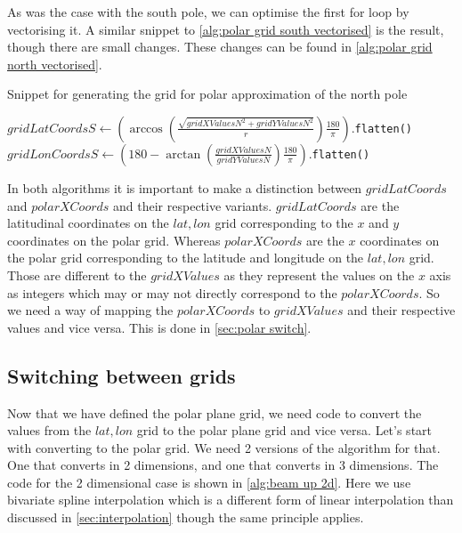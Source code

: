 As was the case with the south pole, we can optimise the first for loop by vectorising it. A similar snippet to \autoref{alg:polar grid south vectorised} is the result, though there are small 
changes. These changes can be found in \autoref{alg:polar grid north vectorised}.

\begin{algorithm}[htb]
    \caption{Snippet for generating the grid for polar approximation of the north pole}
    \label{alg:polar grid north vectorised}
    $gridLatCoordsS \leftarrow (\arccos(\frac{\sqrt{gridXValuesN^2 + gridYValuesN^2}}{r})\frac{180}{\pi}).$\texttt{flatten()} \;
    $gridLonCoordsS \leftarrow (180 - \arctan(\frac{gridXValuesN}{gridYValuesN})\frac{180}{\pi}).$\texttt{flatten()} \;
\end{algorithm}

In both algorithms it is important to make a distinction between $gridLatCoords$ and $polarXCoords$ and their respective variants. $gridLatCoords$ are the latitudinal coordinates on the 
$lat, lon$ grid corresponding to the $x$ and $y$ coordinates on the polar grid. Whereas $polarXCoords$ are the $x$ coordinates on the polar grid corresponding to the latitude and longitude on 
the $lat, lon$ grid. Those are different to the $gridXValues$ as they represent the values on the $x$ axis as integers which may or may not directly correspond to the $polarXCoords$. So we need 
a way of mapping the $polarXCoords$ to $gridXValues$ and their respective values and vice versa. This is done in \autoref{sec:polar switch}.

\subsection{Switching between grids} \label{sec:polar switch}
Now that we have defined the polar plane grid, we need code to convert the values from the $lat, lon$ grid to the polar plane grid and vice versa. Let's start with converting to the polar grid. 
We need 2 versions of the algorithm for that. One that converts in 2 dimensions, and one that converts in 3 dimensions. The code for the 2 dimensional case is shown in \autoref{alg:beam up 2d}.
Here we use bivariate spline interpolation \cite{bivariatespline} which is a different form of linear interpolation than discussed in \autoref{sec:interpolation} though the same principle 
applies.

